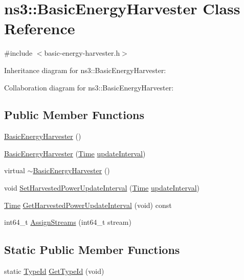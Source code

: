\hypertarget{classns3_1_1BasicEnergyHarvester}{}\section{ns3\+:\+:Basic\+Energy\+Harvester Class Reference}
\label{classns3_1_1BasicEnergyHarvester}


{\ttfamily \#include $<$basic-\/energy-\/harvester.\+h$>$}



Inheritance diagram for ns3\+:\+:Basic\+Energy\+Harvester\+:


Collaboration diagram for ns3\+:\+:Basic\+Energy\+Harvester\+:
\subsection*{Public Member Functions}
\begin{DoxyCompactItemize}
\item 
\hyperlink{classns3_1_1BasicEnergyHarvester_aadffe6f7262d29b63d84b9e12d4539f5}{Basic\+Energy\+Harvester} ()
\item 
\hyperlink{classns3_1_1BasicEnergyHarvester_a8dc9cb9d750eba5b60356afa6d4e1944}{Basic\+Energy\+Harvester} (\hyperlink{classns3_1_1Time}{Time} \hyperlink{mmwave-epc-amc-test_8cc_adb43d41f676710da0bfbc1ca090e3076}{update\+Interval})
\item 
virtual \hyperlink{classns3_1_1BasicEnergyHarvester_aed02cce485f131caa506f072b466cd27}{$\sim$\+Basic\+Energy\+Harvester} ()
\item 
void \hyperlink{classns3_1_1BasicEnergyHarvester_a6e50dec1a1903c158ed701f2dfbe911c}{Set\+Harvested\+Power\+Update\+Interval} (\hyperlink{classns3_1_1Time}{Time} \hyperlink{mmwave-epc-amc-test_8cc_adb43d41f676710da0bfbc1ca090e3076}{update\+Interval})
\item 
\hyperlink{classns3_1_1Time}{Time} \hyperlink{classns3_1_1BasicEnergyHarvester_a1448fa0e16f31445ba81ea780693c81f}{Get\+Harvested\+Power\+Update\+Interval} (void) const 
\item 
int64\+\_\+t \hyperlink{classns3_1_1BasicEnergyHarvester_a9572d4892db98c109eed03b77bb9fd6c}{Assign\+Streams} (int64\+\_\+t stream)
\end{DoxyCompactItemize}
\subsection*{Static Public Member Functions}
\begin{DoxyCompactItemize}
\item 
static \hyperlink{classns3_1_1TypeId}{Type\+Id} \hyperlink{classns3_1_1BasicEnergyHarvester_accbef0a2e6ad0d9f721b449561ecfd14}{Get\+Type\+Id} (void)
\end{DoxyCompactItemize}
